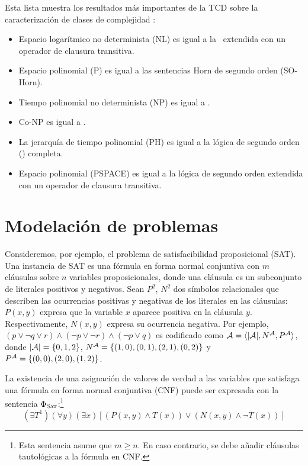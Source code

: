 Esta lista muestra los resultados más importantes de la TCD sobre la
caracterización de clases de complejidad \citep{immerman:book}:
\begin{itemize}
\item Espacio logarítmico no determinista (NL) es igual a la \LPO\ extendida con
un operador de clausura transitiva.
\item Espacio polinomial (P) es igual a las sentencias Horn de segundo orden
(SO-Horn).
\item Tiempo polinomial no determinista (NP) es igual a \SOE.
\item Co-NP es igual a \SOA.
\item La jerarquía de tiempo polinomial (PH) es igual a la lógica 
de segundo orden (\LSO) completa.
\item Espacio polinomial (PSPACE) es igual a la lógica de segundo orden
extendida con un operador de clausura transitiva.
\end{itemize}


\section{Modelación de problemas}
Consideremos, por ejemplo, el problema de satisfacibilidad
proposicional (SAT). Una instancia de SAT es una fórmula en forma normal
conjuntiva con $m$ cláusulas sobre $n$ variables proposicionales, donde una
cláusula es un subconjunto de literales positivos y negativos. 
Sean $P^2$, $N^2$ dos símbolos relacionales que describen las ocurrencias
positivas y negativas de los literales en las cláusulas: $P(x, y)$ expresa que
la variable $x$ aparece positiva en la cláusula $y$. Respectivamente, $N(x, y)$ expresa
su ocurrencia negativa.
Por ejemplo, $(p\lor \neg q\lor r)\land(\neg p\lor \neg r)\land(\neg p\lor q)$
es codificado como $\mathcal{A}=\langle |\mathcal{A}|,N^{\mathcal{A}},P^{\mathcal{A}} \rangle$, donde $|\mathcal{A}|=\{0,1,2\}$,
$N^{\mathcal{A}}=\{(1,0),(0,1),(2,1),(0,2)\}$ y $P^{\mathcal{A}}=\{(0,0),(2,0),(1,2)\}$.

La existencia de una asignación de valores de verdad a las variables que
satisfaga una fórmula en forma normal conjuntiva (CNF) puede ser expresada con la
sentencia \SOE $\Phi_{\textsc{Sat}}$:\footnote{Esta sentencia
asume que $m\geq n$. En caso contrario, se debe añadir cláusulas tautológicas a
la fórmula en CNF.}
\[ (\exists T^1)(\forall y)(\exists x)[(P(x,y)\land T(x))\lor(N(x,y)\land\neg T(x))] \]

